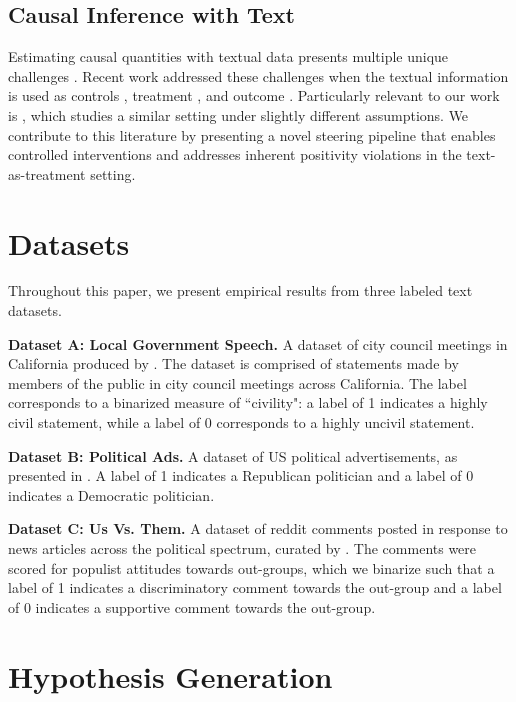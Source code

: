 \documentclass{article}
\theoremstyle{plain}
\theoremstyle{definition}
\theoremstyle{remark}
\begin{document}
\subsection{Causal Inference with Text}

Estimating causal quantities with textual data presents multiple unique challenges \cite{feder2022causal, egami2022make}. Recent work addressed these challenges when the textual information is used as controls \cite{veitch2020adapting, mozer2020matching}, treatment \cite{fong2016discovery, pryzant2021causal, gui2022causal, ash2023text, angelopoulos2024value}, and outcome \cite{modarressi2025causal}. Particularly relevant to our work is \citet{imai2025causalrepresentationlearninggenerative}, which studies a similar setting under slightly different assumptions. We contribute to this literature by presenting a novel steering pipeline that enables controlled interventions and addresses inherent positivity violations in the text-as-treatment setting.

\section{Datasets}
\label{sec:Datasets}

Throughout this paper, we present empirical results from three labeled text datasets.

\textbf{Dataset A: Local Government Speech.} A dataset of city council meetings in California produced by \citet{martinvenugopal}. The dataset is comprised of statements made by members of the public in city council meetings across California. The label corresponds to a binarized measure of ``civility": a label of 1 indicates a highly civil statement, while a label of 0 corresponds to a highly uncivil statement.

\textbf{Dataset B: Political Ads.} A dataset of US political advertisements, as presented in \citet{sobhani2024multienvironmenttopicmodels}.
A label of 1 indicates a Republican politician and a label of 0 indicates a Democratic politician.

\textbf{Dataset C: Us Vs. Them.} A dataset of reddit comments posted
in response to news articles across the political
spectrum, curated by \citet{huguet-cabot-etal-2021-us}. The comments were scored for populist attitudes towards out-groups, which we binarize such that a label of 1 indicates a discriminatory comment towards the out-group and a label of 0 indicates a supportive comment towards the out-group.

\section{Hypothesis Generation}
\end{document}
